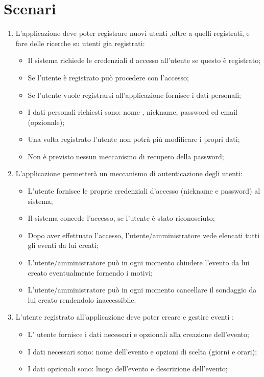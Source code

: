 \chapter{Scenari}
\begin{enumerate}
\item L'applicazione deve poter registrare nuovi utenti ,oltre a quelli registrati, e fare delle ricerche su utenti gia registrati: 
\begin{itemize}
\item Il sistema richiede le credenziali d accesso all'utente se questo è registrato;
\item Se l'utente è registrato può procedere con l'accesso;
\item Se l'utente vuole registrarsi all'applicazione fornisce i dati personali;
\item I dati personali richiesti sono: nome , nickname, password ed email (opzionale);
\item Una volta registrato l'utente non potrà più modificare i propri dati;
\item Non è previsto nessun meccanismo di recupero della password; 
\end{itemize}
\item L'applicazione permetterà un meccanismo di autenticazione degli utenti:
\begin{itemize}
\item L'utente fornisce le proprie credenziali d'accesso (nickname e password) al sistema;
\item Il sistema concede l'accesso, se l'utente è stato riconosciuto;
\item Dopo aver effettuato l'accesso, l'utente/amministratore vede elencati tutti gli eventi da lui creati;
\item L'utente/amministratore può in ogni momento chiudere l'evento da lui creato eventualmente fornendo i motivi;
\item L'utente/amministratore può in ogni momento cancellare il sondaggio da lui creato rendendolo inaccessibile.
\end{itemize}
\item L'utente registrato all'applicazione deve poter creare e gestire eventi :
\begin{itemize}
\item L' utente fornisce i dati necessari e opzionali alla creazione dell'evento;
\item I dati necessari sono: nome dell'evento e opzioni di scelta (giorni e orari);
\item I dati opzionali sono: luogo dell'evento e descrizione dell'evento;

\end{itemize}
\end{enumerate}
